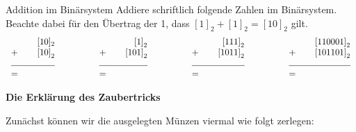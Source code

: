 \documentclass{../../../zirkelblatt}
\begin{document}
\begin{aufgabe}{Addition im Binärsystem}
Addiere schriftlich folgende Zahlen im Binärsystem. Beachte dabei für den
Übertrag der 1, dass $[1]_2 + [1]_2 = [10]_2$ gilt.
\[\begin{array}{rrrrrrrrr}
[10]_{2} & \quad \quad \quad & \left[ 1 \right]_2 & \quad \quad \quad & \left[ 111 \right]_2 & \quad \quad \quad & \left[ 110001 \right]_2 \\
+ \quad \quad \left[ 10 \right]_{2} & & + \quad \quad \left[ 101 \right]_2 & & + \quad \quad \left[ 1011 \right]_2 & & + \quad \quad \left[ 101101 \right]_2 \\
\hrulefill & & \hrulefill & & \hrulefill & & \hrulefill \\
= \hfill & & = \hfill & & = \hfill & & = \hfill
\end{array}\]
\end{aufgabe}

\pagebreak
\begin{center}\Large\textbf{Die Erklärung des Zaubertricks}\end{center}

Zunächst können wir die ausgelegten Münzen viermal wie folgt zerlegen:
\end{document}
